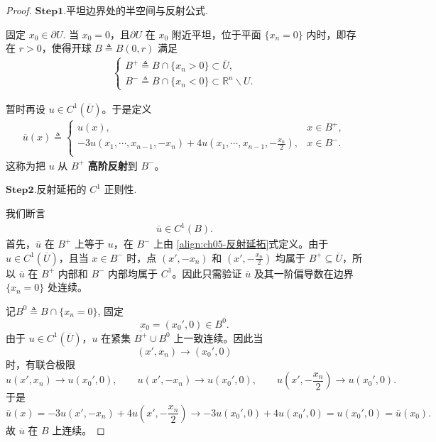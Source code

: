 \documentclass[../../main.tex]{subfiles}%
\begin{document}
\begin{proof}

\noindent$\mathbf{Step}\bm{1}$.{\heiti 平坦边界处的半空间与反射公式.}

固定 \(x_0 \in \partial U\). 当 \(x_0 = 0\)，且\(\partial U\) 在 \(x_0\) 附近平坦，位于平面 \(\{x_n=0\}\) 内时，即存在 \(r>0\)，使得开球 \(B \triangleq B(0,r)\) 满足
\begin{align*}
\begin{cases}
B^{+}\triangleq B\cap\{x_{n}> 0\}\subset\overline{U},\\
B^{-}\triangleq B\cap\{x_{n}< 0\}\subset\mathbb{R}^{n}\backslash U.
\end{cases}
\end{align*}


暂时再设 $u\in C^{1}(\overline{U})$。于是定义
\begin{align}
\overline{u}(x)\triangleq
\begin{cases}
u\left( x \right) ,&		x\in B^+,\\
-3u\left( x_1,\cdots ,x_{n-1},-x_n \right) +4u\left( x_1,\cdots ,x_{n-1},-\frac{x_n}{2} \right) ,&		x\in B^-.\\
\end{cases}
\label{align:ch05-反射延拓}
\end{align}
这称为把 $u$ 从 $B^{+}$ \textbf{高阶反射}到 $B^{-}$。

\noindent$\mathbf{Step}\bm{2}$.{\heiti 反射延拓的 \(C^1\) 正则性.}

我们断言
\begin{align*}
\overline{u}\in C^{1}(B).
\end{align*}
首先，\(\overline{u}\) 在 \(B^+\) 上等于 \(u\)，在 \(B^-\) 上由 \eqref{align:ch05-反射延拓}式定义。由于 \(u \in C^1(\overline{U})\)，且当 \(x \in B^-\) 时，点 \((x',-x_n)\) 和 \(\left(x',-\frac{x_n}{2}\right)\) 均属于 \(B^+ \subseteq \overline{U}\)，所以 \(\overline{u}\) 在 \(B^+\) 内部和 \(B^-\) 内部均属于 \(C^1\)。因此只需验证 \(\overline{u}\) 及其一阶偏导数在边界 \(\{x_n=0\}\) 处连续。

记$B^{0}\triangleq B\cap\{x_n=0\}$,
固定
\[
x_0=(x_0',0)\in B^{0}.
\]
由于 \(u\in C^{1}(\overline U)\)，\(u\) 在紧集 \(\overline{B^{+}}\cup B^{0}\) 上一致连续。因此当
\[
(x',x_n)\to(x_0',0)
\]
时，有联合极限
\[
u(x',x_n)\to u(x_0',0),\qquad
u(x',-x_n)\to u(x_0',0),\qquad
u\left(x',-\frac{x_n}{2}\right)\to u(x_0',0).
\]
于是
\[
\overline u(x)
=-3u(x',-x_n)+4u\left(x',-\frac{x_n}{2}\right)
\to -3u(x_0',0)+4u(x_0',0)
=u(x_0',0)
=\overline u(x_0).
\]
故 \(\overline u\) 在 \(B\) 上连续。


\end{proof}
\end{document}
